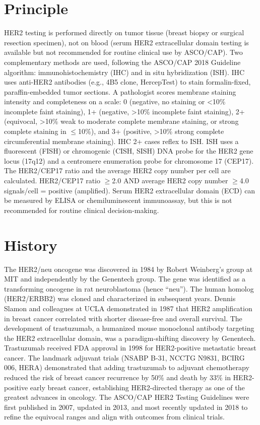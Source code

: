 \section*{Principle}
HER2 testing is performed directly on tumor tissue (breast biopsy or surgical resection specimen), not on blood (serum HER2 extracellular domain testing is available but not recommended for routine clinical use by ASCO/CAP). Two complementary methods are used, following the ASCO/CAP 2018 Guideline algorithm: immunohistochemistry (IHC) and in situ hybridization (ISH). IHC uses anti-HER2 antibodies (e.g., 4B5 clone, HercepTest) to stain formalin-fixed, paraffin-embedded tumor sections. A pathologist scores membrane staining intensity and completeness on a scale: 0 (negative, no staining or <10\% incomplete faint staining), 1+ (negative, >10\% incomplete faint staining), 2+ (equivocal, >10\% weak to moderate complete membrane staining, or strong complete staining in $\leq$10\%), and 3+ (positive, >10\% strong complete circumferential membrane staining). IHC 2+ cases reflex to ISH. ISH uses a fluorescent (FISH) or chromogenic (CISH, SISH) DNA probe for the HER2 gene locus (17q12) and a centromere enumeration probe for chromosome 17 (CEP17). The HER2/CEP17 ratio and the average HER2 copy number per cell are calculated. HER2/CEP17 ratio $\geq$2.0 AND average HER2 copy number $\geq$4.0 signals/cell = positive (amplified). Serum HER2 extracellular domain (ECD) can be measured by ELISA or chemiluminescent immunoassay, but this is not recommended for routine clinical decision-making.

\section*{History}
The HER2/neu oncogene was discovered in 1984 by Robert Weinberg's group at MIT and independently by the Genentech group. The gene was identified as a transforming oncogene in rat neuroblastoma (hence ``neu''). The human homolog (HER2/ERBB2) was cloned and characterized in subsequent years. Dennis Slamon and colleagues at UCLA demonstrated in 1987 that HER2 amplification in breast cancer correlated with shorter disease-free and overall survival. The development of trastuzumab, a humanized mouse monoclonal antibody targeting the HER2 extracellular domain, was a paradigm-shifting discovery by Genentech. Trastuzumab received FDA approval in 1998 for HER2-positive metastatic breast cancer. The landmark adjuvant trials (NSABP B-31, NCCTG N9831, BCIRG 006, HERA) demonstrated that adding trastuzumab to adjuvant chemotherapy reduced the risk of breast cancer recurrence by 50\% and death by 33\% in HER2-positive early breast cancer, establishing HER2-directed therapy as one of the greatest advances in oncology. The ASCO/CAP HER2 Testing Guidelines were first published in 2007, updated in 2013, and most recently updated in 2018 to refine the equivocal ranges and align with outcomes from clinical trials.

